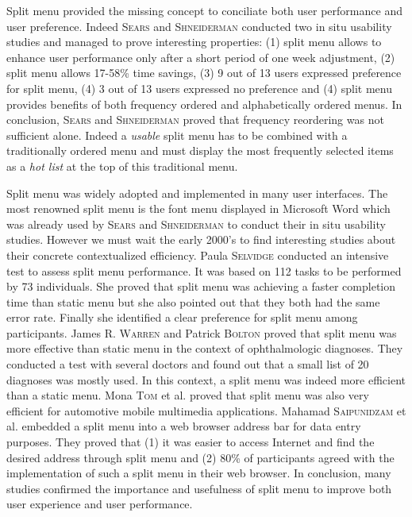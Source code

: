 \begin{figure}[!ht]
    
    \label{fig:sears_split}
\end{figure}

Split menu provided the missing concept to conciliate both user performance and 
user preference. Indeed \textsc{Sears} and \textsc{Shneiderman} conducted two 
in situ usability 
studies and managed to prove interesting properties: (1) split menu allows to 
enhance user performance only after a short period of one week adjustment, (2) 
split menu allows 17-58\% time savings, (3) 9 out of 13 users expressed 
preference for split menu, (4) 3 out of 13 users expressed no preference and 
(4) 
split menu provides benefits of both frequency ordered and alphabetically 
ordered menus. In conclusion, \textsc{Sears} and \textsc{Shneiderman} proved 
that frequency 
reordering was not sufficient alone. Indeed a \textit{usable} split menu has to 
be 
combined with a traditionally ordered menu and must display the most 
frequently selected items as a \textit{hot list} at the top of this 
traditional menu.\newline

Split menu was widely adopted and implemented in many user interfaces. The most 
renowned split menu is the font menu displayed in Microsoft Word which 
was already used by \textsc{Sears} and \textsc{Shneiderman} to conduct their in 
situ usability studies. However we must wait the early 2000’s to find 
interesting studies about their concrete contextualized efficiency. Paula 
\textsc{Selvidge} \cite{paula} conducted an intensive test to assess split menu 
performance. It was based on 112 tasks to be performed by 73 individuals. She 
proved that split menu was achieving a faster completion time than static menu 
but she also pointed out that they both had the same error rate. Finally she 
identified a clear preference for split menu among participants. James R. 
\textsc{Warren} and Patrick \textsc{Bolton} \cite{warren_bolton} proved that 
split menu was more effective than static menu in the context of ophthalmologic 
diagnoses. They conducted a test with several doctors and found out that a small 
list of 20 diagnoses was mostly used. In this context, a split menu was indeed 
more efficient than a static menu. Mona \textsc{Tom} et al. \cite{mona} proved 
that split menu was also very efficient for automotive mobile multimedia 
applications. Mahamad \textsc{Saipunidzam} et al. \cite{saipu} embedded a split 
menu into a web browser address bar for data entry purposes. They proved that 
(1) it was easier to access Internet and find the desired address through split 
menu and (2) 80\% of participants agreed with the implementation of such a 
split menu in their web browser. In conclusion, many studies confirmed the 
importance and usefulness of split menu to improve both user experience and 
user performance.


